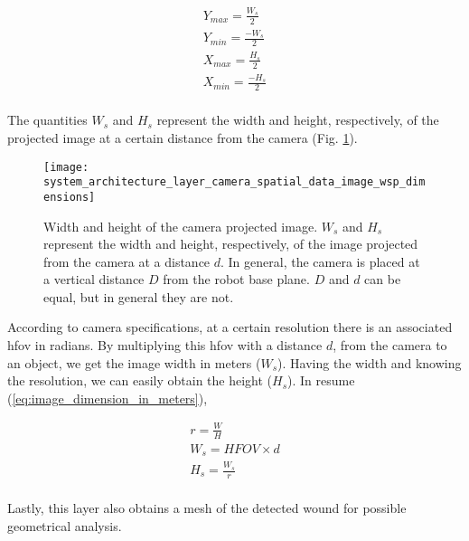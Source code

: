\begin{equation}
\label{eq:workspace_limits}
    \left.
    \begin{aligned}
        Y_{max} = \frac{W_s}{2} \\
        Y_{min} = \frac{-W_s}{2} \\
        X_{max} = \frac{H_s}{2} \\
        X_{min} = \frac{-H_s}{2} \\
    \end{aligned}
    \right.
\end{equation}

The quantities $W_s$ and $H_s$ represent the width and height, respectively, of the projected image at a certain distance from the camera (Fig. \ref{fig:system_architecture_layer_camera_spatial_data_image_wsp_dimensions}).

\begin{figure}[htbp]
	\centering
	\texttt{[image: system\_architecture\_layer\_camera\_spatial\_data\_image\_wsp\_dimensions]}
	\caption{Width and height of the camera projected image. $W_s$ and $H_s$ represent the width and height, respectively, of the image projected from the camera at a distance $d$. In general, the camera is placed at a vertical distance $D$ from the robot base plane. $D$ and $d$ can be equal, but in general they are not.} 
	\label{fig:system_architecture_layer_camera_spatial_data_image_wsp_dimensions}
\end{figure}

According to camera specifications, at a certain resolution there is an associated \gls{hfov} in radians. By multiplying this \gls{hfov} with a distance $d$, from the camera to an object, we get the image width in meters ($W_s$). Having the width and knowing the resolution, we can easily obtain the height ($H_s$). In resume (\ref{eq:image_dimension_in_meters}),

\begin{equation}
\label{eq:image_dimension_in_meters}
    \left.
    \begin{aligned}
        r = \frac{W}{H} \\
        W_s = HFOV \times d \\
        H_s = \frac{W_s}{r} \\
    \end{aligned}
    \right.
\end{equation}

Lastly, this layer also obtains a mesh of the detected wound for possible geometrical analysis.


